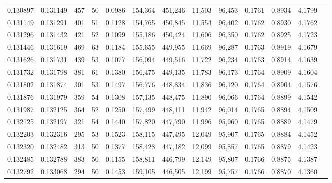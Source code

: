 \begin{tabular}{rrrrrrrrrrrrr}
0.130897 & 0.131149 &   457 &  50 &                                     0.0986 & 154,364 & 451,246 &  11,503 &  96,453 & 0.1761 & 0.8934 & 4.1799 \\
0.131149 & 0.131291 &   401 &  51 &                                     0.1128 & 154,765 & 450,845 &  11,554 &  96,402 & 0.1762 & 0.8930 & 4.1762 \\
0.131296 & 0.131432 &   421 &  52 &                                     0.1099 & 155,186 & 450,424 &  11,606 &  96,350 & 0.1762 & 0.8925 & 4.1723 \\
0.131446 & 0.131619 &   469 &  63 &                                     0.1184 & 155,655 & 449,955 &  11,669 &  96,287 & 0.1763 & 0.8919 & 4.1679 \\
0.131626 & 0.131731 &   439 &  53 &                                     0.1077 & 156,094 & 449,516 &  11,722 &  96,234 & 0.1763 & 0.8914 & 4.1639 \\
0.131732 & 0.131798 &   381 &  61 &                                     0.1380 & 156,475 & 449,135 &  11,783 &  96,173 & 0.1764 & 0.8909 & 4.1604 \\
0.131802 & 0.131874 &   301 &  53 &                                     0.1497 & 156,776 & 448,834 &  11,836 &  96,120 & 0.1764 & 0.8904 & 4.1576 \\
0.131876 & 0.131979 &   359 &  54 &                                     0.1308 & 157,135 & 448,475 &  11,890 &  96,066 & 0.1764 & 0.8899 & 4.1542 \\
0.131987 & 0.132125 &   364 &  52 &                                     0.1250 & 157,499 & 448,111 &  11,942 &  96,014 & 0.1765 & 0.8894 & 4.1509 \\
0.132125 & 0.132197 &   321 &  54 &                                     0.1440 & 157,820 & 447,790 &  11,996 &  95,960 & 0.1765 & 0.8889 & 4.1479 \\
0.132203 & 0.132316 &   295 &  53 &                                     0.1523 & 158,115 & 447,495 &  12,049 &  95,907 & 0.1765 & 0.8884 & 4.1452 \\
0.132320 & 0.132482 &   313 &  50 &                                     0.1377 & 158,428 & 447,182 &  12,099 &  95,857 & 0.1765 & 0.8879 & 4.1423 \\
0.132485 & 0.132788 &   383 &  50 &                                     0.1155 & 158,811 & 446,799 &  12,149 &  95,807 & 0.1766 & 0.8875 & 4.1387 \\
0.132792 & 0.133068 &   294 &  50 &                                     0.1453 & 159,105 & 446,505 &  12,199 &  95,757 & 0.1766 & 0.8870 & 4.1360 \\

\end{tabular}

